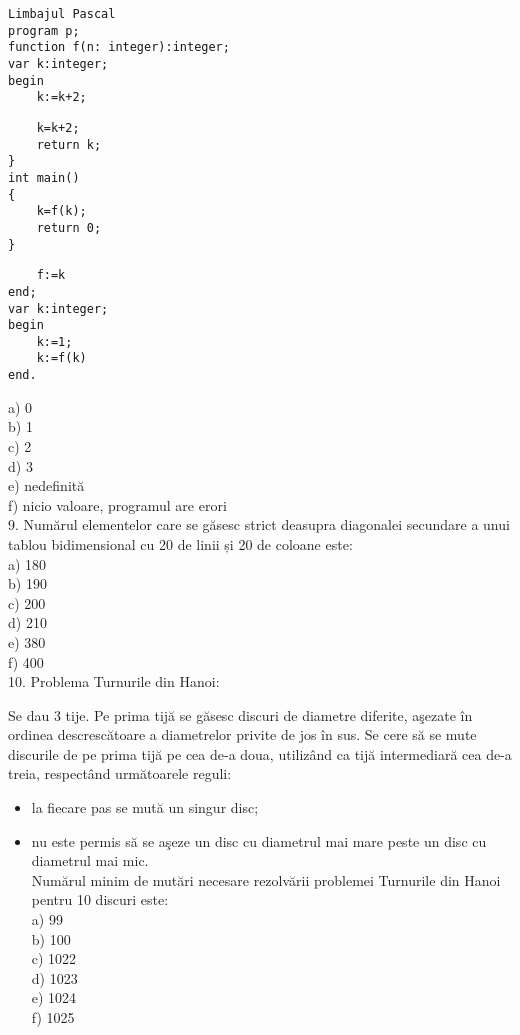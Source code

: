 \begin{verbatim}
Limbajul Pascal
program p;
function f(n: integer):integer;
var k:integer;
begin
    k:=k+2;
\end{verbatim}

\begin{verbatim}
    k=k+2;
    return k;
}
int main()
{
    k=f(k);
    return 0;
}
\end{verbatim}

\begin{verbatim}
    f:=k
end;
var k:integer;
begin
    k:=1;
    k:=f(k)
end.
\end{verbatim}

a) 0\\
b) 1\\
c) 2\\
d) 3\\
e) nedefinită\\
f) nicio valoare, programul are erori\\
9. Numărul elementelor care se găsesc strict deasupra diagonalei secundare a unui tablou bidimensional cu 20 de linii și 20 de coloane este:\\
a) 180\\
b) 190\\
c) 200\\
d) 210\\
e) 380\\
f) 400\\
10. Problema Turnurile din Hanoi:

Se dau 3 tije. Pe prima tijă se găsesc discuri de diametre diferite, aşezate în ordinea descrescătoare a diametrelor privite de jos în sus. Se cere să se mute discurile de pe prima tijă pe cea de-a doua, utilizând ca tijă intermediară cea de-a treia, respectând următoarele reguli:

\begin{itemize}
  \item la fiecare pas se mută un singur disc;
  \item nu este permis să se aşeze un disc cu diametrul mai mare peste un disc cu diametrul mai mic.\\
Numărul minim de mutări necesare rezolvării problemei Turnurile din Hanoi pentru 10 discuri este:\\
a) 99\\
b) 100\\
c) 1022\\
d) 1023\\
e) 1024\\
f) 1025
\end{itemize}

